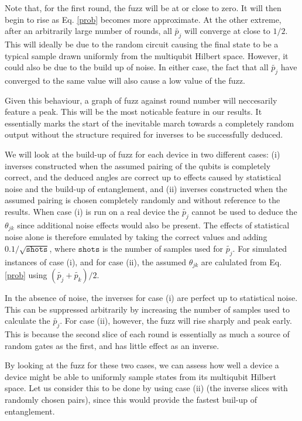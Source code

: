 \documentclass[aps,prl,twocolumn,showpacs,preprintnumbers]{revtex4-1}
\begin{document}
Note that, for the first round, the fuzz will be at or close to zero. It will then begin to rise as Eq. \ref{prob} becomes more approximate. At the other extreme, after an arbitrarily large number of rounds, all $\tilde{p_j}$ will converge at close to $1/2$. This will ideally be due to the random circuit causing the final state to be a typical sample drawn uniformly from the multiqubit Hilbert space. However, it could also be due to the build up of noise. In either case, the fact that all $\tilde{p_j}$ have converged to the same value will also cause a low value of the fuzz.

Given this behaviour, a graph of fuzz against round number will neccesarily feature a peak. This will be the most noticable feature in our results. It essentially marks the start of the inevitable march towards a completely random output without the structure required for inverses to be successfully deduced.

We will look at the build-up of fuzz for each device in two different cases: (i) inverses constructed when the assumed pairing of the qubits is completely correct, and the deduced angles are correct up to effects caused by statistical noise and the build-up of entanglement, and (ii) inverses constructed when the assumed pairing is chosen completely randomly and without reference to the results. When case (i) is run on a real device the $\tilde{p_j}$ cannot be used to deduce the $\theta_{jk}$ since additional noise effects would also be present. The effects of statistical noise alone is therefore emulated by taking the correct values and adding $0.1/\sqrt{\mathtt{shots}}$, where $\mathtt{shots}$ is the number of samples used for $\tilde{p_j}$. For simulated instances of case (i), and for case (ii), the assumed $\theta_{jk}$ are calulated from Eq. \ref{prob} using $(\tilde{p_j}+\tilde{p_k})/2$.

In the absence of noise, the inverses for case (i) are perfect up to statistical noise. This can be suppressed arbitrarily by increasing the number of samples used to calculate the $\tilde{p_j}$. For case (ii), however, the fuzz will rise sharply and peak early. This is because the second slice of each round is essentially as much a source of random gates as the first, and has little effect as an inverse.

By looking at the fuzz for these two cases, we can assess how well a device a device might be able to uniformly sample states from its multiqubit Hilbert space. Let us consider this to be done by using case (ii) (the inverse slices with randomly chosen pairs), since this would provide the fastest buil-up of entanglement.
\end{document}
